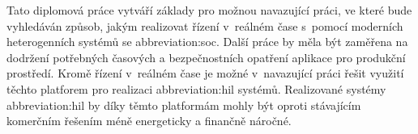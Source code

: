 \documentclass[a4paper, twoside, 11pt]{article}
\begin{document}
Tato diplomová práce vytváří základy pro možnou navazující práci, ve které bude vyhledáván způsob, jakým realizovat řízení v~reálném čase s~pomocí moderních heterogenních systémů se \gls{abbreviation:soc}. Další práce by měla být zaměřena na dodržení potřebných časových a bezpečnostních opatření aplikace pro produkční prostředí. Kromě řízení v~reálném čase je možné v~navazující práci řešit využití těchto platforem pro realizaci \gls{abbreviation:hil} systémů. Realizované systémy \gls{abbreviation:hil} by díky těmto platformám mohly být oproti stávajícím komerčním řešením méně energeticky a finančně náročné.
\par
	

\flushbottom %


\newpage
\setmonofont{Times New Roman}
\printbibliography[title={{Literatura}}]	
\nocite{*}
\setmonofont{Courier}
	\appendix
\end{document}
